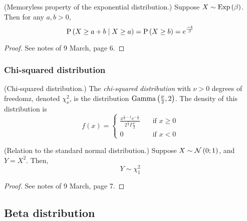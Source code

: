 \documentclass[11pt]{article}
\begin{document}
\begin{thm}{(Memoryless property of the exponential distribution.)}
    Suppose $X \sim \operatorname{Exp}\left(\beta\right)$.
    Then for any $a, b > 0$,
    \begin{equation}
        \label{eq:exponential-memoryless}
        \operatorname{P}{\left(X \geq a + b \;\vert\; X \geq a\right)}
        =
        \operatorname{P}{\left(X \geq b\right)}
        =
        e^\frac{-b}{\beta}
    \end{equation}
\end{thm}

\begin{proof}
    See notes of 9 March, page 6.
\end{proof}

\subsubsection{Chi-squared distribution}

\begin{defn}{(Chi-squared distribution.)}
    The \emph{chi-squared distribution} with $\nu > 0$ degrees of freedomz,
    denoted $\chi^2_\nu$, is the distribution $\operatorname{Gamma}\left(\frac{\nu}{2}, 2\right)$.
    The density of this distribution is
    \begin{equation*}
        f(x) = \begin{cases}
            \frac{
                x^{\frac{\nu}{2} - 1} e^{-\frac{x}{2}}
            }{
                2^{\frac{\nu}{2}} \Gamma{\frac{\nu}{2}}
            }
                &\quad\text{if } x \geq 0 \\
            0   &\quad\text{if } x < 0
        \end{cases}
    \end{equation*}
\end{defn}

\begin{thm}{(Relation to the standard normal distribution.)}
    Suppose $X \sim \operatorname{\mathcal{N}}\left(0;1\right)$, and $Y = X^2$.
    Then,
    \begin{equation}
        \label{eq:square-normal-chi-squared}
        Y \sim \chi^2_1
    \end{equation}
\end{thm}

\begin{proof}
    See notes of 9 March, page 7.
\end{proof}

\subsection{Beta distribution}
\end{document}

